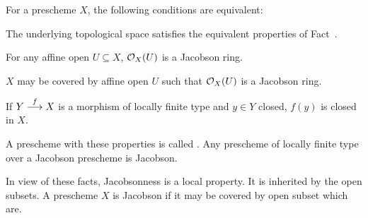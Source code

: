 \documentclass[a4paper,parskip=half,numbers=enddot, DIV=12]{scrreprt}
\begin{document}
\begin{defi}
    For a prescheme $X$, the following conditions are equivalent:
    \begin{alphanumerate}
    \item 
        The underlying topological space satisfies the equivalent properties of Fact~.
    \item 
        For any affine open $U\subseteq X$, $\mathcal{O}_X(U)$ is a Jacobson ring.
    \item 
        $X$ may be covered by affine open $U$ such that $\mathcal{O}_X(U)$ is a Jacobson ring.
    \item 
        If $Y\morphism[f] X$ is a morphism of locally finite type and $y\in Y$ closed, $f(y)$ is closed in $X$. 
    \end{alphanumerate}
    A prescheme with these properties is called . Any prescheme of locally finite type over a Jacobson prescheme is Jacobson.
\end{defi}
\begin{rem*}
    In view of these facts, Jacobsonness is a local property. It is inherited by the open subsets. A prescheme $X$ is Jacobson if it may be covered by open subset which are.
\end{rem*}
\end{document}
